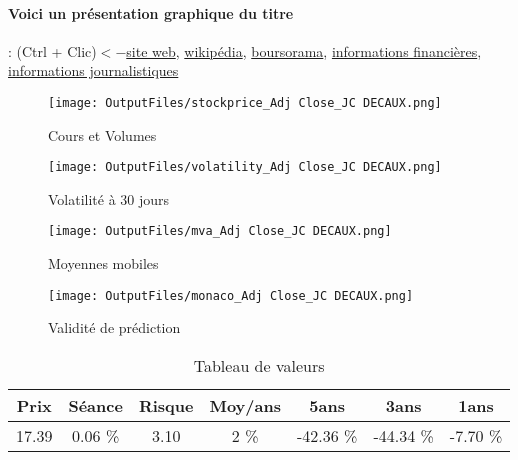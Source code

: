 \documentclass[11pt,a4paper]{report}%
\begin{document}
\paragraph{Voici un présentation graphique du titre} : (Ctrl + Clic)$<-$\href{https://www.jcdecaux.com/fr/investisseurs}{site web}, \href{https://fr.wikipedia.org/wiki/JCDecaux}{wikipédia}, \href{https://www.boursorama.com/cours/1rPDEC}{boursorama}, \href{https://www.qwant.com/?q=site:https:%2f%2fwww.easybourse.com%2faction-societe%2fJC-DECAUX&t=web&client=ext-firefox-hp}{informations financières}, \href{https://bourse.lerevenu.com/cours-de-bourse/fiche-valeur-synthese/JC-DECAUX/DEC-FR}{informations journalistiques}
\begin{figure}[!htb]
   \begin{minipage}{0.5\textwidth}
     \centering
     \texttt{[image: OutputFiles/stockprice\_Adj Close\_JC DECAUX.png]}
     \caption{Cours et Volumes}\label{Fig:price_JC DECAUX}
   \end{minipage}\hfill
   \begin{minipage}{0.5\textwidth}
     \centering
     \texttt{[image: OutputFiles/volatility\_Adj Close\_JC DECAUX.png]}
     \caption{Volatilité à 30 jours}\label{Fig:volat_JC DECAUX}
   \end{minipage}
\end{figure}
\begin{figure}[!htb]
   \begin{minipage}{0.5\textwidth}
     \centering
     \texttt{[image: OutputFiles/mva\_Adj Close\_JC DECAUX.png]}
     \caption{Moyennes mobiles}\label{Fig:mva_JC DECAUX}
   \end{minipage}\hfill
   \begin{minipage}{0.5\textwidth}
     \centering
     \texttt{[image: OutputFiles/monaco\_Adj Close\_JC DECAUX.png]}
     \caption{Validité de prédiction}\label{Fig:prediction_JC DECAUX}
   \end{minipage}
\end{figure}

\begin{table}[H]
  \centering
    \begin{tabular}{|c|c|c|c|c|c|c|}
    \hline
    Prix & Séance & Risque  & Moy/ans & 5ans & 3ans & 1ans \\
    \hline
    17.39 &    0.06 \%    & 3.10 & 2 \% & -42.36 \% & -44.34 \% & -7.70 \% \\
    \hline
    \end{tabular}%
        \label{tab:table_JC DECAUX}%
      \caption{Tableau de valeurs}
\end{table}%
\end{document}
